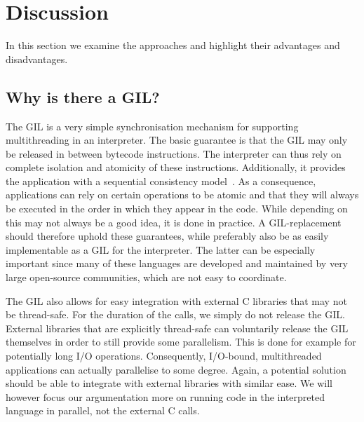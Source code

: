 \documentclass{sigplanconf}
\begin{document}
\section{Discussion}

In this section we examine the approaches and highlight their
advantages and disadvantages.


\subsection{Why is there a GIL?}
The GIL is a very simple synchronisation mechanism for supporting
multithreading in an interpreter. The basic guarantee is that the GIL
may only be released in between bytecode instructions. The interpreter
can thus rely on complete isolation and atomicity of these
instructions. Additionally, it provides the application with a
sequential consistency model~\cite{lamport79}. As a consequence,
applications can rely on certain operations to be atomic and that they
will always be executed in the order in which they appear in the
code. While depending on this may not always be a good idea, it is
done in practice. A GIL-replacement should therefore uphold these
guarantees, while preferably also be as easily implementable as a GIL
for the interpreter. The latter can be especially important since
many of these languages are developed and maintained by very large
open-source communities, which are not easy to coordinate.

The GIL also allows for easy integration with external C libraries that
may not be thread-safe. For the duration of the calls, we
simply do not release the GIL. External libraries that are explicitly
thread-safe can voluntarily release the GIL themselves in order to
still provide some parallelism. This is done for example for
potentially long I/O operations. Consequently, I/O-bound,
multithreaded applications can actually parallelise to some
degree. Again, a potential solution should be able to integrate with
external libraries with similar ease. We will however focus our
argumentation more on running code in the interpreted language in
parallel, not the external C calls.
\end{document}
